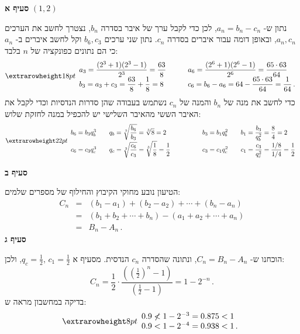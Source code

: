 \textbf{סעיף א}
$(1,2)$

נתון ש-%
$a_n=b_n-c_n$,
לכן כדי לקבל ערך של איבר בסדרה
$b_n$,
נצטרך לחשב את הערכים
$a_n,c_n$,
ובאופן דומה עבור איברים בסדרה
$c_n$.
נתון שני ערכים
$b_6,c_3$
וקל לחשב איברים ב-%
$a_n$
כי הם נתונים כפונקציה של 
$n$ 
בלבד:
\[
\erh{18pt}
\begin{array}{l@{\hspace{3em}}l}
\displaystyle a_3=\frac{(2^3+1)(2^3-1)}{2^3}=\frac{63}{8}&\displaystyle a_6=\frac{(2^6+1)(2^6-1)}{2^6}= \frac{65\cdot 63}{64}\\
\displaystyle b_3=a_3+c_3=\frac{63}{8}+\frac{1}{8}=8 &\displaystyle  c_6=b_6-a_6=64-\frac{65\cdot 63}{64}=\frac{1}{64}\,.
\end{array}
\]
כדי לחשב את מנה של
$b_n$
והמנה של
$c_n$
נשתמש בעבודה שהן סדרות הנדסיות וכדי לקבל את האיבר הששי מהאיבר השלישי יש להכפיל במנה לחזקת שלוש:
\vspace{-1ex}
\[
\erh{22pt}
\begin{array}{l@{\hspace{2em}}l@{\hspace{5em}}l@{\hspace{2em}}l}
b_6=b_3q_b^3 & \displaystyle q_b=\sqrt[3]{\frac{b_6}{b_3}}=\sqrt[3]{8}=2& b_3=b_1 q_b^2 & \displaystyle b_1=\frac{b_3}{q_b^2}=\frac{8}{4}=2\\
c_6=c_3q_c^3 & \displaystyle q_c=\sqrt[3]{\frac{c_6}{c_3}} =\sqrt[3]{\frac{1}{8}} = \frac{1}{2}& c_3=c_1 q_c^2 & \displaystyle c_1=\frac{c_3}{q_c^2}=\frac{1/8}{1/4}=\frac{1}{2}
\end{array}
\]

\np

\textbf{סעיף ב}

הטיעון נובע מחוקי הקיבוץ והחילוף של מספרים שלמים:
\begin{eqnarray*}
C_n &=& (b_1-a_1) + (b_2 - a_2) + \cdots + (b_n-a_n)\\
&=&(b_1 + b_2 + \cdots + b_n) - (a_1 + a_2 + \cdots + a_n)\\
&=& B_n - A_n\,.
\end{eqnarray*}
\textbf{סעיף ג}

הוכחנו ש-%
$C_n=B_n-A_n$,
ונתונה שהסדרה 
$c_n$
הנדסית. מסעיף א
$\displaystyle q_c=\frac{1}{2},\,c_1=\frac{1}{2}$,
ולכן:
\[
C_n = \frac{1}{2}\cdot\frac{\displaystyle\left(\left(\frac{1}{2}\right)^n-1\right)}{\displaystyle\left(\frac{1}{2}-1\right)}=1-2^{-n}\,.
\]
בדיקה במחשבון מראה ש:
\[
\erh{8pt}
\begin{array}{l}
0.9 \not< 1-2^{-3}=0.875<1\\
0.9 < 1-2^{-4}=0.938 < 1\,.
\end{array}
\]

